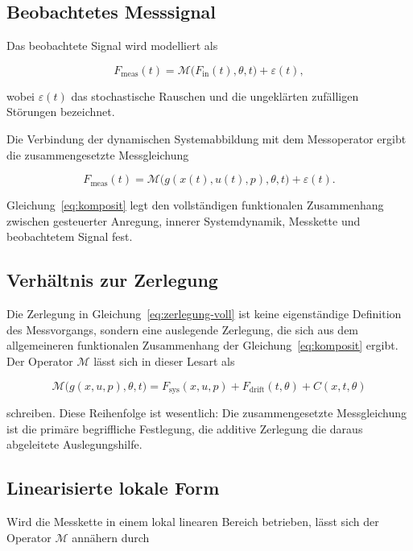 \documentclass[12pt,a4paper]{report}
\begin{document}
\subsection{Beobachtetes Messsignal}

Das beobachtete Signal wird modelliert als

\begin{equation}
F_{\mathrm{meas}}(t) = \mathcal{M}\bigl(F_{\mathrm{in}}(t), \theta, t\bigr) + \varepsilon(t),
\label{eq:beobachtet}
\end{equation}

wobei $\varepsilon(t)$ das stochastische Rauschen und die ungeklärten
zufälligen Störungen bezeichnet.

Die Verbindung der dynamischen Systemabbildung mit dem Messoperator
ergibt die zusammengesetzte Messgleichung

\begin{equation}
F_{\mathrm{meas}}(t) = \mathcal{M}\bigl(g(x(t),u(t),p), \theta, t\bigr) + \varepsilon(t).
\label{eq:komposit}
\end{equation}

Gleichung~\eqref{eq:komposit} legt den vollständigen funktionalen
Zusammenhang zwischen gesteuerter Anregung, innerer Systemdynamik,
Messkette und beobachtetem Signal fest.

\subsection{Verhältnis zur Zerlegung}

Die Zerlegung in Gleichung~\eqref{eq:zerlegung-voll} ist keine
eigenständige Definition des Messvorgangs, sondern eine auslegende
Zerlegung, die sich aus dem allgemeineren funktionalen Zusammenhang der
Gleichung~\eqref{eq:komposit} ergibt. Der Operator $\mathcal{M}$ lässt
sich in dieser Lesart als

\[
\mathcal{M}\bigl(g(x,u,p), \theta, t\bigr)
= F_{\mathrm{sys}}(x,u,p) + F_{\mathrm{drift}}(t,\theta) + C(x,t,\theta)
\]

schreiben. Diese Reihenfolge ist wesentlich: Die zusammengesetzte
Messgleichung ist die primäre begriffliche Festlegung, die additive
Zerlegung die daraus abgeleitete Auslegungshilfe.

\subsection{Linearisierte lokale Form}

Wird die Messkette in einem lokal linearen Bereich betrieben, lässt sich
der Operator $\mathcal{M}$ annähern durch
\end{document}
